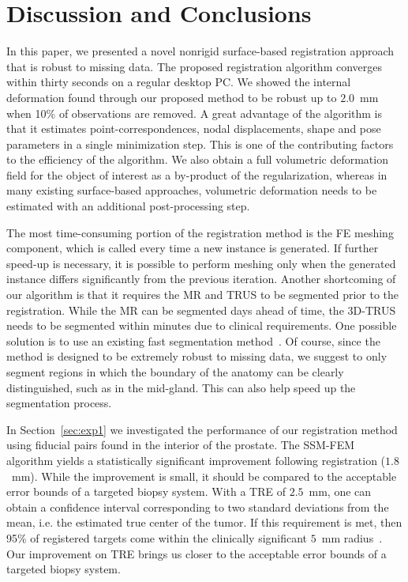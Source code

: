 \documentclass[journal]{IEEEtran}
\begin{document}
\section{Discussion and Conclusions}
In this paper, we presented a novel nonrigid surface-based registration approach that is robust to missing data. The proposed registration algorithm converges within thirty seconds on a regular desktop PC. We showed the internal deformation found through our proposed method to be robust up to $2.0$~mm when 10\% of observations are removed. A great advantage of the algorithm is that it estimates point-correspondences, nodal displacements, shape and pose parameters in a single minimization step.  This is one of the contributing factors to the efficiency of the algorithm.  We also obtain a full volumetric deformation field for the object of interest as a by-product of the regularization, whereas in many existing surface-based approaches, volumetric deformation needs to be estimated with an additional post-processing step.

The most time-consuming portion of the registration method is the FE meshing component, which is called every time a new instance is generated. If further speed-up is necessary, it is possible to perform meshing only when the generated instance differs significantly from the previous iteration. Another shortcoming of our algorithm is that it requires the MR and TRUS to be segmented prior to the registration. While the MR can be segmented days ahead of time, the 3D-TRUS needs to be segmented within minutes due to clinical requirements. One possible solution is to use an existing fast segmentation method~\cite{Qiu12a}. Of course, since the method is designed to be extremely robust to missing data, we suggest to only segment regions in which the boundary of the anatomy can be clearly distinguished, such as in the mid-gland. This can also help speed up the segmentation process.

In Section~\ref{sec:exp1} we investigated the performance of our registration method using fiducial pairs found in the interior of the prostate. The SSM-FEM algorithm yields a statistically significant improvement following registration ($1.8$~mm). While the improvement is small, it should be compared to the acceptable error bounds of a targeted biopsy system. With a TRE of $2.5$~mm, one can obtain a confidence interval corresponding to two standard deviations from the mean, i.e. the estimated true center of the tumor. If this requirement is met, then 95\% of registered targets come within the clinically significant $5$~mm radius~\cite{Karnik10a}. Our improvement on TRE brings us closer to the acceptable error bounds of a targeted biopsy system.
\end{document}
